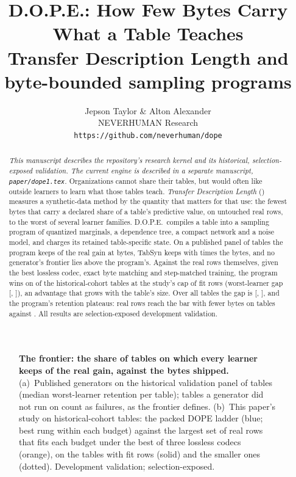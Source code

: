 \documentclass{article}
\title{\textsc{D.O.P.E.}: How Few Bytes Carry What a Table Teaches\\[0.3em]
\large Transfer Description Length and byte-bounded sampling programs}
\author{Jepson Taylor \& Alton Alexander\\NEVERHUMAN Research\\\texttt{https://github.com/neverhuman/dope}}
\theoremstyle{remark}
\begin{document}
\maketitle
\fancyhead{}
\renewcommand{\headrulewidth}{0pt}

\begin{abstract}
\emph{This manuscript describes the repository's research kernel and its historical, selection-exposed
validation. The current engine is described in a separate manuscript, \texttt{paper/dope1.tex}.}
Organizations cannot share their tables, but would often like outside learners to learn what those tables
teach. \emph{Transfer Description Length} (\MetricName) measures a synthetic-data method by the quantity
that matters for that use: the fewest bytes that carry a declared share of a table's predictive value, on
untouched real rows, to the worst of several learner families. D.O.P.E.\ compiles a table into a sampling
program of quantized marginals, a dependence tree, a compact network and a noise model, and charges its retained table-specific state. On a published panel of \EbPublishedTables{} tables the program keeps
\EbPublishedRobust{} of the real gain at \EbPublishedBytes{} bytes, TabSyn keeps \EbTabSynRobust{} with
\EbTabSynFactor{} times the bytes, and no generator's frontier lies above the program's. Against the real
rows themselves, given the best lossless codec, exact byte matching and step-matched training, the program
wins on \EbLargeWins{} of the \EbLargeLineages{} historical-cohort tables at the study's cap of \cFitCap{} fit rows
(worst-learner gap \EbLargeGap{} [\EbLargeGapLo, \EbLargeGapHi]), an advantage that grows with the table's
size. Over all \EbLineages{} tables the gap is \EbGap{} [\EbGapLo, \EbGapHi], and the program's retention
plateaus: real rows reach the \cTau{} bar with fewer bytes on \EbTdlEightyData{} tables against
\EbTdlEightyDope{}. All results are selection-exposed development validation.
\end{abstract}

\begin{figure}[!b]
  \centering
  \caption{\textbf{The \MetricName{} frontier: the share of tables on which every learner keeps
  \cTau{} of the real gain, against the bytes shipped.} (a)~Published generators on the historical
  validation panel of \EbPublishedTables{} tables (median worst-learner retention per table); tables a
  generator did not run on count as failures, as the frontier defines. (b)~This paper's study on
  \EbLineages{} historical-cohort tables: the packed DOPE ladder (blue; best rung within each budget) against the
  largest set of real rows that fits each budget under the best of three lossless codecs (orange), on the
  \EbLargeLineages{} tables with \cFitCap{} fit rows (solid) and the smaller ones (dotted). Development
  validation; selection-exposed.}
  \label{fig:frontier}
\end{figure}
\end{document}
